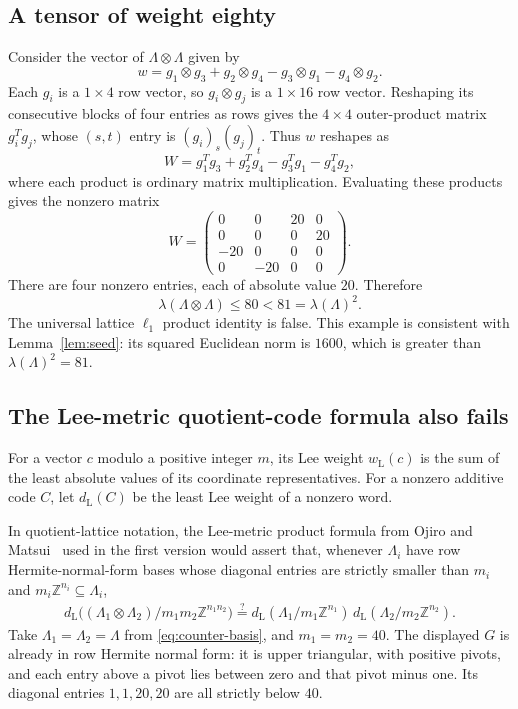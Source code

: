 \documentclass[11pt,letterpaper]{article}
\numberwithin{equation}{section}
\theoremstyle{definition}
\theoremstyle{remark}
\newcommand{\Z}{\mathbb Z}
\begin{document}
\subsection{A tensor of weight eighty}
Consider the vector of $\Lambda\otimes\Lambda$ given by
\[
 w=g_1\otimes g_3+g_2\otimes g_4
    -g_3\otimes g_1-g_4\otimes g_2.
\]
Each $g_i$ is a $1\times4$ row vector, so $g_i\otimes g_j$ is a $1\times16$ row vector. Reshaping its consecutive blocks of four entries as rows gives the $4\times4$ outer-product matrix $g_i^Tg_j$, whose $(s,t)$ entry is $(g_i)_s(g_j)_t$. Thus $w$ reshapes as
\[
 W=g_1^Tg_3+g_2^Tg_4-g_3^Tg_1-g_4^Tg_2,
\]
where each product is ordinary matrix multiplication. Evaluating these products gives the nonzero matrix
\begin{equation}\label{eq:counter-tensor}
 W=\begin{pmatrix}
 0&0&20&0\\
 0&0&0&20\\
 -20&0&0&0\\
 0&-20&0&0
 \end{pmatrix}.
\end{equation}
There are four nonzero entries, each of absolute value $20$. Therefore
\begin{equation}\label{eq:counter-lattice}
 \lambda(\Lambda\otimes\Lambda)\le80<81=\lambda(\Lambda)^2.
\end{equation}
The universal lattice $\ell_1$ product identity is false. This example is consistent with Lemma~\ref{lem:seed}: its squared Euclidean norm is $1600$, which is greater than $\lambda(\Lambda)^2=81$.

\subsection{The Lee-metric quotient-code formula also fails}
For a vector $c$ modulo a positive integer $m$, its Lee weight $w_{\mathrm L}(c)$ is the sum of the least absolute values of its coordinate representatives. For a nonzero additive code $C$, let $d_{\mathrm L}(C)$ be the least Lee weight of a nonzero word.

In quotient-lattice notation, the Lee-metric product formula from Ojiro and Matsui~\cite{om} used in the first version would assert that, whenever $\Lambda_i$ have row Hermite-normal-form bases whose diagonal entries are strictly smaller than $m_i$ and $m_i\Z^{n_i}\subseteq\Lambda_i$,
\begin{equation}\label{eq:false-lee}
\begin{split}
 d_{\mathrm L}\bigl((\Lambda_1\otimes\Lambda_2)/
                    m_1m_2\Z^{n_1n_2}\bigr)
 \stackrel{?}{=}
 d_{\mathrm L}(\Lambda_1/m_1\Z^{n_1})\,
 d_{\mathrm L}(\Lambda_2/m_2\Z^{n_2}).
\end{split}
\end{equation}
Take $\Lambda_1=\Lambda_2=\Lambda$ from \eqref{eq:counter-basis}, and $m_1=m_2=40$. The displayed $G$ is already in row Hermite normal form: it is upper triangular, with positive pivots, and each entry above a pivot lies between zero and that pivot minus one. Its diagonal entries $1,1,20,20$ are all strictly below $40$.
\end{document}
